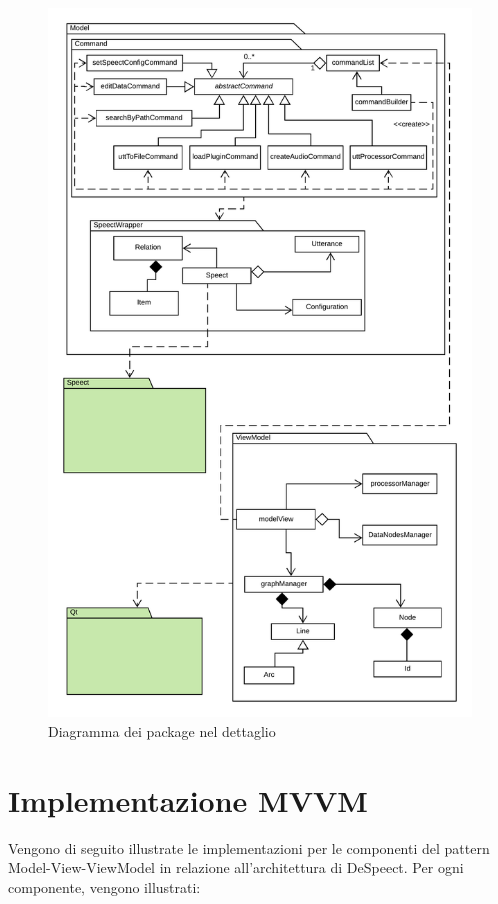 \documentclass[openany,12pt,a4paper]{report}
\begin{document}
\begin{figure}[H]
	\includegraphics[scale=0.63]{PackageDiagram2}
	\centering
	\caption{Diagramma dei package nel dettaglio}
\end{figure}

\chapter{Implementazione MVVM}

Vengono di seguito illustrate le implementazioni per le componenti del pattern Model-View-ViewModel in relazione all'architettura di DeSpeect. Per ogni componente, vengono illustrati:
\end{document}
